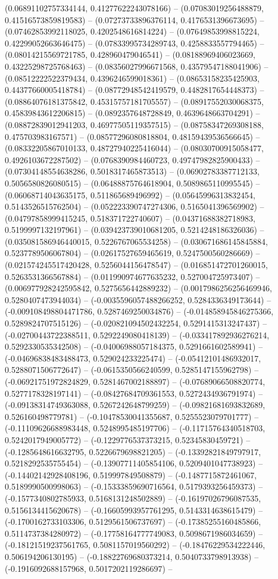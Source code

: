 (0.06891102757334144, 0.41277622243078166) -- (0.07083019256488879, 0.41516573859819583) -- (0.07273733896376114, 0.4176531396673695) -- (0.07462853992118025, 0.4202548616814224) -- (0.07649853998815224, 0.42299052663646475) -- (0.07833995734289743, 0.4258833557794465) -- (0.08014215569721785, 0.428960479046541) -- (0.08188969406023669, 0.43225298725768463) -- (0.08356027996671568, 0.43579547188041906) -- (0.08512222522379434, 0.4396246599018361) -- (0.08653158235425903, 0.44377660005418784) -- (0.08772948542419579, 0.4482817654448373) -- (0.08864076181375842, 0.45315757181705557) -- (0.08917552030068375, 0.45839843612206815) -- (0.0892357648728849, 0.4639648663704291) -- (0.08872839012941203, 0.46977505119357515) -- (0.08758347269308188, 0.475703983167571) -- (0.08577296080818804, 0.48159439536566645) -- (0.08332205867010133, 0.48727940225416044) -- (0.08030700915058477, 0.4926103672287502) -- (0.0768390984460723, 0.49747982825900433) -- (0.07304148554638286, 0.5018317465873513) -- (0.06902783387712133, 0.5056580826080515) -- (0.06488875764618904, 0.5089865110995545) -- (0.06068714043635175, 0.511865689496992) -- (0.05645996313832454, 0.5143526515762504) -- (0.052223390747274306, 0.5165041396569902) -- (0.04797858999415245, 0.518371722740607) -- (0.04371688382718983, 0.5199997132197961) -- (0.039423739010681205, 0.5214248186326036) -- (0.035081586946440015, 0.5226767065534258) -- (0.030671686145845884, 0.5237789506067804) -- (0.02617527659465619, 0.5247500560286669) -- (0.021574245517420428, 0.5256044156478547) -- (0.016851472701260015, 0.5263531366567884) -- (0.011990974677635232, 0.527004725973407) -- (0.006977928242595842, 0.5275656442889232) -- (0.0017986256256469946, 0.5280407473944034) -- (-0.0035596057488266252, 0.5284336349173644) -- (-0.009108498804471786, 0.5287469250034876) -- (-0.014858945846275366, 0.5289824707515126) -- (-0.020821094502432254, 0.5291415313247437) -- (-0.02700443722388511, 0.5292249080418139) -- (-0.033417892936276214, 0.5292330535342508) -- (-0.04006988057184375, 0.5291661602589941) -- (-0.04696838483488473, 0.529024233225474) -- (-0.05412101486932017, 0.5288071506772647) -- (-0.0615350566240599, 0.5285147155962798) -- (-0.06921751972824829, 0.5281467002188897) -- (-0.07689066508820774, 0.5277178328197141) -- (-0.08427684709361553, 0.5272434936791974) -- (-0.09138314749363088, 0.5267242648799259) -- (-0.09821681693832689, 0.526160498779781) -- (-0.10478530041355687, 0.5255523079701777) -- (-0.11109626688983448, 0.5248995485197706) -- (-0.11715764340518703, 0.5242017949005772) -- (-0.1229776537373215, 0.52345830459721) -- (-0.1285648616632795, 0.5226679698821205) -- (-0.13392821849797917, 0.5218292535755454) -- (-0.13907711405854106, 0.5209401047738923) -- (-0.14402142928408196, 0.519997849508879) -- (-0.1487715872461067, 0.5189990500998063) -- (-0.15333859690716564, 0.5179393256459373) -- (-0.1577340802785933, 0.5168131248502889) -- (-0.16197026796087535, 0.5156134415620678) -- (-0.16605993957761295, 0.5143314638615479) -- (-0.1700162733103306, 0.5129561506737697) -- (-0.17385255160485866, 0.5114737384280972) -- (-0.17758164777749083, 0.5098671986034659) -- (-0.18121519237561765, 0.5081157019560292) -- (-0.18476229534222446, 0.506194206130195) -- (-0.18822769680373214, 0.5040733798913938) -- (-0.1916092688157968, 0.5017202119286697) -- 